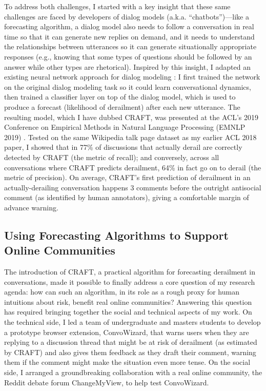 \documentclass[11pt,letterpaper]{article}
\begin{document}
To address both challenges, I started with a key insight that these same challenges are faced by developers of dialog models (a.k.a. ``chatbots'')---like a forecasting algorithm, a dialog model also needs to follow a conversation in real time so that it can generate new replies on demand, and it needs to understand the relationships between utterances so it can generate situationally appropriate responses (e.g., knowing that some types of questions should be followed by an answer while other types are rhetorical).
Inspired by this insight, I adapted an existing neural network approach for dialog modeling \cite{serban_building_2016}: I first trained the network on the original dialog modeling task so it could learn conversational dynamics, then trained a classifier layer on top of the dialog model, which is used to produce a forecast (likelihood of derailment) after each new utterance.
The resulting model, which I have dubbed CRAFT, was presented at the ACL's 2019 Conference on Empirical Methods in Natural Language Processing (EMNLP 2019) \cite{chang_trouble_2019}.
Tested on the same Wikipedia talk page dataset as my earlier ACL 2018 paper, I showed that in 77\% of discussions that actually derail are correctly detected by CRAFT (the metric of recall); and conversely, across all conversations where CRAFT predicts derailment, 64\% in fact go on to derail (the metric of precision).
On average, CRAFT's first prediction of derailment in an actually-derailing conversation happens 3 comments before the outright antisocial comment (as identified by human annotators), giving a comfortable margin of advance warning.

\subsection{Using Forecasting Algorithms to Support Online Communities}
The introduction of CRAFT, a practical algorithm for forecasting derailment in conversations, made it possible to finally address a core question of my research agenda: how can such an algorithm, in its role as a rough proxy for human intuitions about risk, benefit real online communities?
Answering this question has required bringing together the social and technical aspects of my work.
On the technical side, I led a team of undergraduate and masters students to develop a prototype browser extension, ConvoWizard, that warns users when they are replying to a discussion thread that might be at risk of derailment (as estimated by CRAFT) and also gives them feedback as they draft their comment, warning them if the comment might make the situation even more tense.
On the social side, I arranged a groundbreaking collaboration with a real online community, the Reddit debate forum ChangeMyView, to help test ConvoWizard.
\end{document}
